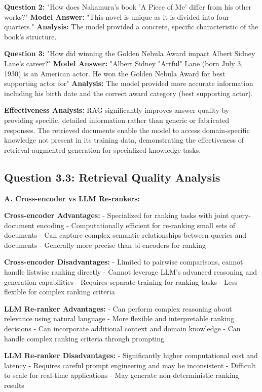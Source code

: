 \documentclass[11pt]{article}
\begin{document}
\textbf{Question 2:} "How does Nakamura's book 'A Piece of Me' differ from his other works?"
\textbf{Model Answer:} "This novel is unique as it is divided into four quarters."
\textbf{Analysis:} The model provided a concrete, specific characteristic of the book's structure.

\textbf{Question 3:} "How did winning the Golden Nebula Award impact Albert Sidney Lane's career?"
\textbf{Model Answer:} "Albert Sidney "Artful" Lane (born July 3, 1930) is an American actor. He won the Golden Nebula Award for best supporting actor for"
\textbf{Analysis:} The model provided more accurate information including his birth date and the correct award category (best supporting actor).

\textbf{Effectiveness Analysis:} RAG significantly improves answer quality by providing specific, detailed information rather than generic or fabricated responses. The retrieved documents enable the model to access domain-specific knowledge not present in its training data, demonstrating the effectiveness of retrieval-augmented generation for specialized knowledge tasks.

\subsection{Question 3.3: Retrieval Quality Analysis}

\textbf{A. Cross-encoder vs LLM Re-rankers:}

\textbf{Cross-encoder Advantages:}
- Specialized for ranking tasks with joint query-document encoding
- Computationally efficient for re-ranking small sets of documents
- Can capture complex semantic relationships between queries and documents
- Generally more precise than bi-encoders for ranking

\textbf{Cross-encoder Disadvantages:}
- Limited to pairwise comparisons, cannot handle listwise ranking directly
- Cannot leverage LLM's advanced reasoning and generation capabilities
- Requires separate training for ranking tasks
- Less flexible for complex ranking criteria

\textbf{LLM Re-ranker Advantages:}
- Can perform complex reasoning about relevance using natural language
- More flexible and interpretable ranking decisions
- Can incorporate additional context and domain knowledge
- Can handle complex ranking criteria through prompting

\textbf{LLM Re-ranker Disadvantages:}
- Significantly higher computational cost and latency
- Requires careful prompt engineering and may be inconsistent
- Difficult to scale for real-time applications
- May generate non-deterministic ranking results
\end{document}

